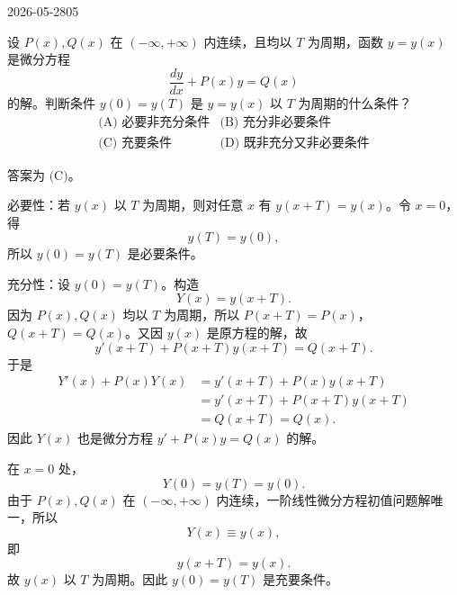 \begin{mistake}{2026-05-28}{05}

\begin{problemcontent}
设 \(P(x),Q(x)\) 在 \((-
\infty,+\infty)\) 内连续，且均以 \(T\) 为周期，函数 \(y=y(x)\) 是微分方程
\[
\frac{dy}{dx}+P(x)y=Q(x)
\]
的解。判断条件 \(y(0)=y(T)\) 是 \(y=y(x)\) 以 \(T\) 为周期的什么条件？
\[
\begin{array}{ll}
\text{(A) 必要非充分条件} & \text{(B) 充分非必要条件}\\
\text{(C) 充要条件} & \text{(D) 既非充分又非必要条件}
\end{array}
\]
\end{problemcontent}

\begin{solutioncontent}
答案为 \(\text{(C)}\)。

必要性：若 \(y(x)\) 以 \(T\) 为周期，则对任意 \(x\) 有 \(y(x+T)=y(x)\)。令 \(x=0\)，得
\[
y(T)=y(0),
\]
所以 \(y(0)=y(T)\) 是必要条件。

充分性：设 \(y(0)=y(T)\)。构造
\[
Y(x)=y(x+T).
\]
因为 \(P(x),Q(x)\) 均以 \(T\) 为周期，所以 \(P(x+T)=P(x)\)，\(Q(x+T)=Q(x)\)。又因 \(y(x)\) 是原方程的解，故
\[
y'(x+T)+P(x+T)y(x+T)=Q(x+T).
\]
于是
\[
\begin{aligned}
Y'(x)+P(x)Y(x)
&=y'(x+T)+P(x)y(x+T)\\
&=y'(x+T)+P(x+T)y(x+T)\\
&=Q(x+T)=Q(x).
\end{aligned}
\]
因此 \(Y(x)\) 也是微分方程 \(y'+P(x)y=Q(x)\) 的解。

在 \(x=0\) 处，
\[
Y(0)=y(T)=y(0).
\]
由于 \(P(x),Q(x)\) 在 \((-
\infty,+\infty)\) 内连续，一阶线性微分方程初值问题解唯一，所以
\[
Y(x)\equiv y(x),
\]
即
\[
y(x+T)=y(x).
\]
故 \(y(x)\) 以 \(T\) 为周期。因此 \(y(0)=y(T)\) 是充要条件。
\end{solutioncontent}


\end{mistake}
